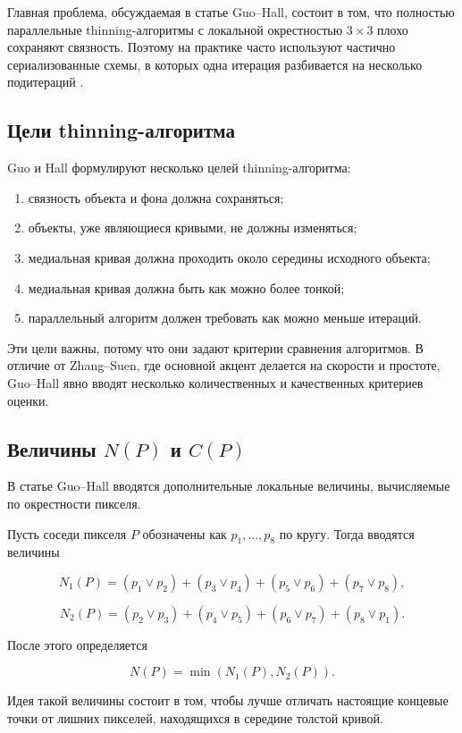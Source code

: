 \documentclass[12pt,a4paper]{article}
\begin{document}
	Главная проблема, обсуждаемая в статье Guo--Hall, состоит в том, что полностью параллельные thinning-алгоритмы с локальной окрестностью $3\times3$ плохо сохраняют связность. Поэтому на практике часто используют частично сериализованные схемы, в которых одна итерация разбивается на несколько подитераций \cite{guo1989}.
	
	\subsection{Цели thinning-алгоритма}
	
	Guo и Hall формулируют несколько целей thinning-алгоритма:
	
	\begin{enumerate}
		\item связность объекта и фона должна сохраняться;
		\item объекты, уже являющиеся кривыми, не должны изменяться;
		\item медиальная кривая должна проходить около середины исходного объекта;
		\item медиальная кривая должна быть как можно более тонкой;
		\item параллельный алгоритм должен требовать как можно меньше итераций.
	\end{enumerate}
	
	Эти цели важны, потому что они задают критерии сравнения алгоритмов. В отличие от Zhang--Suen, где основной акцент делается на скорости и простоте, Guo--Hall явно вводят несколько количественных и качественных критериев оценки.
	
	\subsection{Величины $N(P)$ и $C(P)$}
	
	В статье Guo--Hall вводятся дополнительные локальные величины, вычисляемые по окрестности пикселя.
	
	Пусть соседи пикселя $P$ обозначены как $p_1,\ldots,p_8$ по кругу. Тогда вводятся величины
	
	\[
	N_1(P)=
	(p_1\vee p_2)+
	(p_3\vee p_4)+
	(p_5\vee p_6)+
	(p_7\vee p_8),
	\]
	
	\[
	N_2(P)=
	(p_2\vee p_3)+
	(p_4\vee p_5)+
	(p_6\vee p_7)+
	(p_8\vee p_1).
	\]
	
	После этого определяется
	
	\[
	N(P)=\min(N_1(P),N_2(P)).
	\]
	
	Идея такой величины состоит в том, чтобы лучше отличать настоящие концевые точки от лишних пикселей, находящихся в середине толстой кривой.
	
\end{document}
